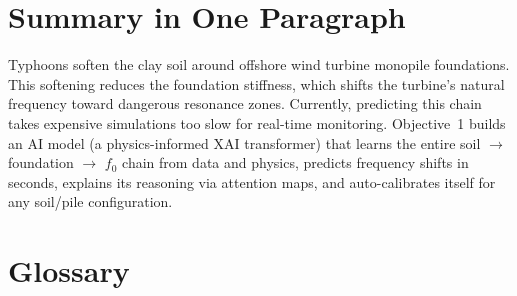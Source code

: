 \documentclass[11pt,a4paper]{article}
\begin{document}
\section{Summary in One Paragraph}

\begin{tcolorbox}[colback=blue!5, colframe=blue!50!black]
Typhoons soften the clay soil around offshore wind turbine monopile
foundations.  This softening reduces the foundation stiffness, which shifts
the turbine's natural frequency toward dangerous resonance zones.  Currently,
predicting this chain takes expensive simulations too slow for real-time
monitoring.  Objective~1 builds an AI model (a physics-informed XAI
transformer) that learns the entire soil $\to$ foundation $\to$ $f_0$ chain
from data and physics, predicts frequency shifts in seconds, explains its
reasoning via attention maps, and auto-calibrates itself for any soil/pile
configuration.
\end{tcolorbox}

\section{Glossary}
\end{document}
